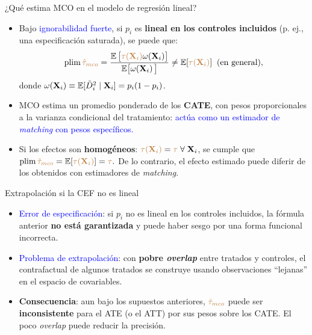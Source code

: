 \documentclass[10pt, xcolor=dvipsnames]{beamer}
\begin{document}
\begin{frame}{¿Qué estima MCO en el modelo de regresión lineal?}\label{DIAP:MCO}
\begin{itemize}
    \item Bajo \textcolor{blue}{ignorabilidad fuerte}, si \(p_i\) es \textbf{lineal en los controles incluidos} (p. ej., una especificación saturada), se puede \hyperlink{Demostracion-MCO}{{}} que:
    \begin{align*}  
          \plim \brown{\hat\tau_{mco}}
     = \frac{\EX \big[ \brown{\tau(\XB_i)} \omega(\XB_i)\big]}
            {\EX\!\big[\omega(\XB_i)\,\big]} \neq \EX[\brown{\tau(\XB_i)}] \;\; \text{(en general)},
    \end{align*}
    donde \(\omega(\textbf{X}_i) \equiv \operatorname{\mathbb{E}}[\tilde D_i^{2} \mid \textbf{X}_i] = p_i(1-p_i)\).
    \vspace{1em}
    \item MCO estima un promedio ponderado de los \textbf{CATE}, con pesos proporcionales a la varianza condicional del tratamiento: \textcolor{blue}{actúa como un estimador de \emph{matching} con pesos específicos.} %
    \vspace{1em}
    \item Si los efectos son \textbf{homogéneos}: \(\textcolor{brown}{\tau(\textbf{X}_i)}= \textcolor{brown}{\tau} \; \forall \; \textbf{X}_i\), se cumple que \(\plim \brown{\hat\tau_{mco}} = \EX[\brown{\tau(\XB_i)}] = \brown{\tau}.\) De lo contrario, el efecto estimado puede diferir de los obtenidos con estimadores de \emph{matching}.
\end{itemize}    
\end{frame}


\begin{frame}{Extrapolación si la CEF no es lineal}
\begin{itemize}
  \item \textcolor{blue}{Error de especificación}: si \(p_i\) no es lineal en los controles incluidos, la fórmula anterior \textbf{no está garantizada} y puede haber sesgo por una forma funcional incorrecta. %
  \vspace{1em}
  \item \textcolor{blue}{Problema de extrapolación}: con \textbf{pobre \textit{overlap}} entre tratados y controles, el contrafactual de algunos tratados se construye usando observaciones ``lejanas'' en el espacio de covariables. %
  \vspace{1em}
  \item \textbf{Consecuencia}: aun bajo los supuestos anteriores, \(\textcolor{brown}{\hat\tau_{mco}}\) puede ser \textbf{inconsistente} para el ATE (o el ATT) por sus pesos sobre los CATE. El poco \textit{overlap} puede reducir la precisión.
\end{itemize}
\end{frame}
\end{document}
